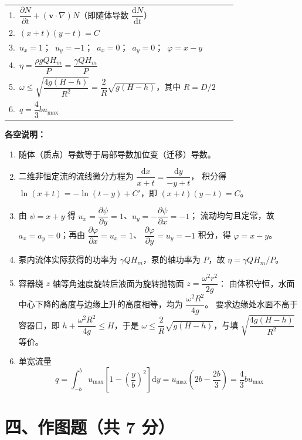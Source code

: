 \begin{center}
\begin{tabular}{@{}p{0.94\linewidth}@{}}
1.\ $\dfrac{\partial N}{\partial t}+(\bm v\cdot\nabla)N$（即随体导数 $\dfrac{\mathrm dN}{\mathrm dt}$）\tabularnewline
2.\ $(x+t)(y-t)=C$\tabularnewline
3.\ $u_x=1$；\ $u_y=-1$；\ $a_x=0$；\ $a_y=0$；\ $\varphi=x-y$\tabularnewline
4.\ $\eta=\dfrac{\rho gQH_m}{P}=\dfrac{\gamma QH_m}{P}$\tabularnewline
5.\ $\omega\le\sqrt{\dfrac{4g(H-h)}{R^{2}}}=\dfrac{2}{R}\sqrt{g(H-h)}$，其中 $R=D/2$\tabularnewline
6.\ $q=\dfrac{4}{3}bu_{\max}$\tabularnewline
\end{tabular}
\end{center}

\begin{tishi}
\textbf{各空说明：}
\begin{enumerate}
  \item 随体（质点）导数等于局部导数加位变（迁移）导数。
  \item 二维非恒定流的流线微分方程为 $\dfrac{\mathrm dx}{x+t}=\dfrac{\mathrm dy}{-y+t}$，
        积分得 $\ln(x+t)=-\ln(t-y)+C'$，即 $(x+t)(y-t)=C$。
  \item 由 $\psi=x+y$ 得 $u_x=\dfrac{\partial\psi}{\partial y}=1$、$u_y=-\dfrac{\partial\psi}{\partial x}=-1$；
        流动均匀且定常，故 $a_x=a_y=0$；再由 $\dfrac{\partial\varphi}{\partial x}=u_x=1$、
        $\dfrac{\partial\varphi}{\partial y}=u_y=-1$ 积分，得 $\varphi=x-y$。
  \item 泵内流体实际获得的功率为 $\gamma QH_m$，泵的轴功率为 $P$，故 $\eta=\gamma QH_m/P$。
  \item 容器绕 $z$ 轴等角速度旋转后液面为旋转抛物面 $z=\dfrac{\omega^{2}r^{2}}{2g}$：
        由体积守恒，水面中心下降的高度与边缘上升的高度相等，均为 $\dfrac{\omega^{2}R^{2}}{4g}$。
        要求边缘处水面不高于容器口，即 $h+\dfrac{\omega^{2}R^{2}}{4g}\le H$，于是
        $\omega\le\dfrac{2}{R}\sqrt{g(H-h)}$，与填 $\sqrt{\dfrac{4g(H-h)}{R^{2}}}$ 等价。
  \item 单宽流量
        \[
        q=\int_{-b}^{b}u_{\max}\left[1-\left(\frac{y}{b}\right)^{2}\right]\mathrm dy
        =u_{\max}\left(2b-\frac{2b}{3}\right)=\frac{4}{3}bu_{\max}
        \]
\end{enumerate}
\end{tishi}

\section{四、作图题（共 7 分）}

